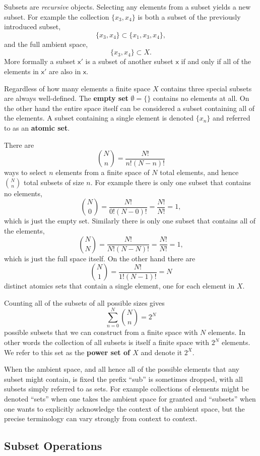 \documentclass[
  letterpaper,
  DIV=11,
  numbers=noendperiod]{scrartcl}
\begin{document}
Subsets are \emph{recursive} objects. Selecting any elements from a
subset yields a new subset. For example the collection \(\{x_3, x_4\}\)
is both a subset of the previously introduced subset, \[
\{ x_3, x_4 \} \subset \{ x_1, x_3, x_4 \},
\] and the full ambient space, \[
\{ x_3, x_4 \} \subset X.
\] More formally a subset \(\mathsf{x}'\) is a subset of another subset
\(\mathsf{x}\) if and only if all of the elements in \(\mathsf{x}'\) are
also in \(\mathsf{x}\).

Regardless of how many elements a finite space \(X\) contains three
special subsets are always well-defined. The \textbf{empty set}
\(\emptyset = \{\}\) contains no elements at all. On the other hand the
entire space itself can be considered a subset containing all of the
elements. A subset containing a single element is denoted
\(\{ x_{n} \}\) and referred to as an \textbf{atomic set}.

There are \[
{N \choose n} = \frac{ N! }{ n! (N - n)!}
\] ways to select \(n\) elements from a finite space of \(N\) total
elements, and hence \({N \choose n}\) total subsets of size \(n\). For
example there is only one subset that contains no elements, \[
{N \choose 0} = \frac{ N! }{ 0! (N - 0)!} = \frac{ N! }{ N! } = 1,
\] which is just the empty set. Similarly there is only one subset that
contains all of the elements, \[
{N \choose N} = \frac{ N! }{ N! (N - N)!} = \frac{ N! }{ N! } = 1,
\] which is just the full space itself. On the other hand there are \[
{N \choose 1} = \frac{ N! }{ 1! (N - 1)!} = N
\] distinct atomics sets that contain a single element, one for each
element in \(X\).

Counting all of the subsets of all possible sizes gives \[
\sum_{n = 0}^{N} {N \choose n} = 2^{N}
\] possible subsets that we can construct from a finite space with \(N\)
elements. In other words the collection of all subsets is itself a
finite space with \(2^{N}\) elements. We refer to this set as the
\textbf{power set of \(X\)} and denote it \(2^{X}\).

When the ambient space, and all hence all of the possible elements that
any subset might contain, is fixed the prefix ``sub'' is sometimes
dropped, with all subsets simply referred to as sets. For example
collections of elements might be denoted ``sets'' when one takes the
ambient space for granted and ``subsets'' when one wants to explicitly
acknowledge the context of the ambient space, but the precise
terminology can vary strongly from context to context.

\hypertarget{subset-operations}{%
\subsection{Subset Operations}\label{subset-operations}}
\end{document}
